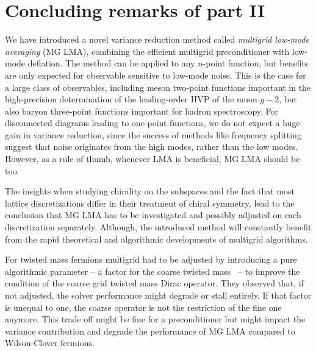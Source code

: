 \chapter{Concluding remarks of part II}
\label{ch:p2:conclusions}



We have introduced a novel variance reduction method called \emph{multigrid low-mode averaging} (MG LMA), combining the efficient multigrid preconditioner with low-mode deflation.
The method can be applied to any $n$-point function, but benefits are only expected for observable sensitive to low-mode noise.
This is the case for a large class of observables, including meson two-point functions important in the high-precision determination of the leading-order HVP of the muon $g-2$, but also baryon three-point functions important for hadron spectroscopy.
For disconnected diagrams leading to one-point functions, we do not expect a huge gain in variance reduction, since the success of methods like frequency splitting suggest that noise originates from the high modes, rather than the low modes.
However, as a rule of thumb, whenever LMA is beneficial, MG LMA should be too.

The insights when studying chirality on the subspaces and the fact that most lattice discretizations differ in their treatment of chiral symmetry, lead to the conclusion that MG LMA has to be investigated and possibly adjusted on each discretization separately.
Although, the introduced method will constantly benefit from the rapid theoretical and algorithmic developments of multigrid algorithms.

For twisted mass fermions multigrid had to be adjusted by introducing a pure algorithmic parameter -- a factor for the coarse twisted mass~\cite{Alexandrou:2016izb} -- to improve the condition of the coarse grid twisted mass Dirac operator.
They observed that, if not adjusted, the solver performance might degrade or stall entirely.
If that factor is unequal to one, the coarse operator is not the restriction of the fine one anymore.
This trade off might be fine for a preconditioner but might impact the variance contribution and degrade the performance of MG LMA compared to Wilson-Clover fermions.

